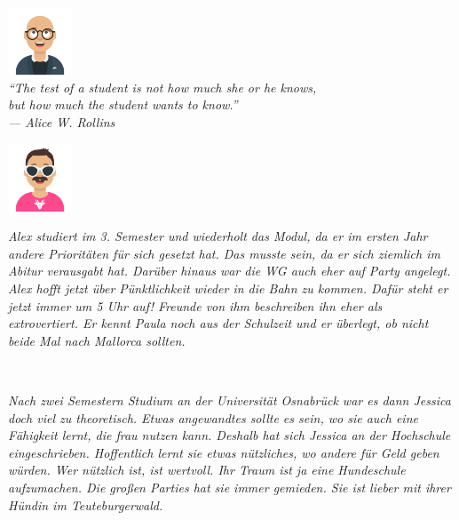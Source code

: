 \documentclass[a4paper, 9pt]{scrartcl}\usepackage[]{graphicx}\usepackage[]{xcolor}
\begin{document}
{\begin{center}
\includegraphics[width = 1.9cm]{avatare/Yuki}\\
\small
\vspace{1.5Ex}
\textit{"`The test of a student is not how much she or he knows,\\ but how much the student wants to know."'\\ --- Alice W. Rollins}
\end{center}}
\maketitle
{}
\thispagestyle{empty}
\clearpage
\begin{minipage}[c]{0.125\textwidth}
\includegraphics[width = 1.9cm]{avatare/Alex}
\end{minipage}
\begin{minipage}[c]{0.875\textwidth}
\textit{Alex studiert im 3. Semester und wiederholt das Modul, da er im ersten Jahr andere Prioritäten für sich gesetzt hat. Das musste sein, da er sich ziemlich im Abitur verausgabt hat. Darüber hinaus war die WG auch eher auf Party angelegt. Alex hofft jetzt über Pünktlichkeit wieder in die Bahn zu kommen. Dafür steht er jetzt immer um 5 Uhr auf! Freunde von ihm beschreiben ihn eher als extrovertiert. Er kennt Paula noch aus der Schulzeit und er überlegt, ob nicht beide Mal nach Mallorca sollten.} 
\end{minipage}\\[2.75Ex]
\begin{minipage}[c]{0.875\textwidth}
\textit{Nach zwei Semestern Studium an der Universität Osnabrück war es dann Jessica doch viel zu theoretisch. Etwas angewandtes sollte es sein, wo sie auch eine Fähigkeit lernt, die frau nutzen kann. Deshalb hat sich Jessica an der Hochschule eingeschrieben. Hoffentlich lernt sie etwas nützliches, wo andere für Geld geben würden. Wer nützlich ist, ist wertvoll. Ihr Traum ist ja eine Hundeschule aufzumachen. Die großen Parties hat sie immer gemieden. Sie ist lieber mit ihrer Hündin im Teuteburgerwald.}
\end{minipage}
\end{document}
